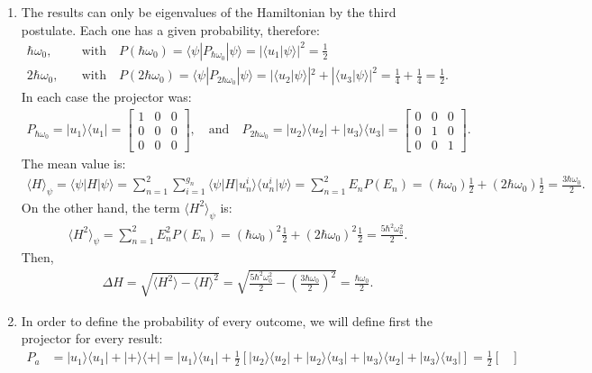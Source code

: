 \documentclass[letterpaper,11pt,twoside]{article}
\newcommand{\ket}[1]{|#1\rangle}
\newcommand{\bra}[1]{\langle#1|}
\newcommand{\braket}[1]{\langle#1\rangle}
\begin{document}
\begin{enumerate}[itemsep=0pt,topsep=0pt,label=\alph*.]
  \item The results can only be eigenvalues of the Hamiltonian by the third postulate. Each one has a given probability, therefore:
  \begin{align*}
    \hbar\omega_0,&\quad\text{with}\quad P(\hbar\omega_0)=\braket{\psi|P_{\hbar\omega_0}|\psi}=|\braket{u_1|\psi}|^2=\frac{1}{2}\\
    2\hbar\omega_0,&\quad\text{with}\quad P(2\hbar\omega_0)=\braket{\psi|P_{2\hbar\omega_0}|\psi}=|\braket{u_2|\psi}|^2+|\braket{u_3|\psi}|^2=\frac{1}{4}+\frac{1}{4}=\frac{1}{2}.
  \end{align*}
  In each case the projector was:
  \begin{align*}
    P_{\hbar\omega_0}=\ket{u_1}\bra{u_1}=\begin{bmatrix}
    1&0&0\\0&0&0\\0&0&0
    \end{bmatrix},\quad\text{and}\quad P_{2\hbar\omega_0}=\ket{u_2}\bra{u_2}+\ket{u_3}\bra{u_3}=\begin{bmatrix}
      0&0&0\\0&1&0\\0&0&1
    \end{bmatrix}.
  \end{align*}
  The mean value is:
  \begin{align*}
    \braket{H}_\psi=\braket{\psi|H|\psi}=\sum_{n=1}^2\sum_{i=1}^{g_n}\braket{\psi|H|u_n^i}\braket{u_n^i|\psi}=\sum_{n=1}^2E_nP(E_n)=(\hbar\omega_0)\frac{1}{2}+(2\hbar\omega_0)\frac{1}{2}=\frac{3\hbar\omega_0}{2}.
  \end{align*}
  On the other hand, the term $\braket{H^2}_\psi$ is:
  \begin{align*}
    \braket{H^2}_\psi=\sum_{n=1}^2E_n^2P(E_n)=(\hbar\omega_0)^2\frac{1}{2}+(2\hbar\omega_0)^2\frac{1}{2}=\frac{5\hbar^2\omega_0^2}{2}.
  \end{align*}
  Then,
  \begin{align*}
    \Delta H=\sqrt{\braket{H^2}-\braket{H}^2}=\sqrt{\frac{5\hbar^2\omega_0^2}{2}-\left(\frac{3\hbar\omega_0}{2}\right)^2}=\frac{\hbar\omega_0}{2}.
  \end{align*}
  \item In order to define the probability of every outcome, we will define first the projector for every result:
  \begin{align*}
    P_a&=\ket{u_1}\bra{u_1}+\ket{+}\bra{+}=\ket{u_1}\bra{u_1}+\frac{1}{2}[\ket{u_2}\bra{u_2}+\ket{u_2}\bra{u_3}+\ket{u_3}\bra{u_2}+\ket{u_3}\bra{u_3}]=\frac{1}{2}\begin{bmatrix}

\end{bmatrix}
\end{align*}
\end{enumerate}
\end{document}
